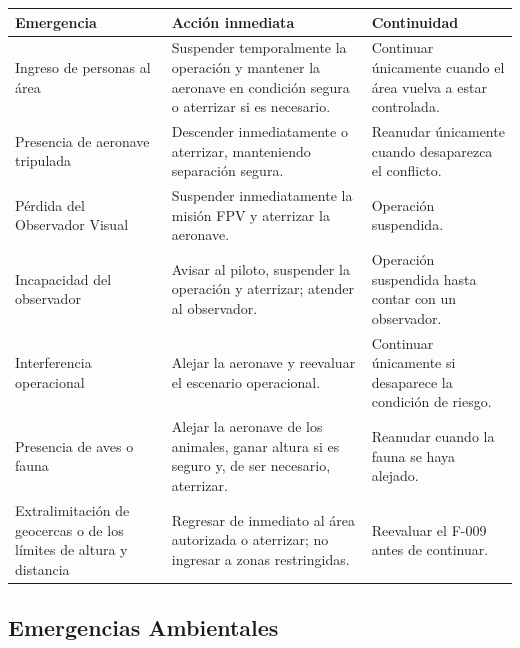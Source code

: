 \begin{longtable}{|p{4.5cm}|p{6cm}|p{3.5cm}|}
\hline

\textbf{Emergencia} &
\textbf{Acción inmediata} &
\textbf{Continuidad}

\\ \hline

Ingreso de personas al área &
Suspender temporalmente la operación y mantener la aeronave en condición segura o aterrizar si es necesario. &
Continuar únicamente cuando el área vuelva a estar controlada.

\\ \hline

Presencia de aeronave tripulada &
Descender inmediatamente o aterrizar, manteniendo separación segura. &
Reanudar únicamente cuando desaparezca el conflicto.

\\ \hline

Pérdida del Observador Visual &
Suspender inmediatamente la misión FPV y aterrizar la aeronave. &
Operación suspendida.

\\ \hline

Incapacidad del observador &
Avisar al piloto, suspender la operación y aterrizar; atender al observador. &
Operación suspendida hasta contar con un observador.

\\ \hline

Interferencia operacional &
Alejar la aeronave y reevaluar el escenario operacional. &
Continuar únicamente si desaparece la condición de riesgo.

\\ \hline

Presencia de aves o fauna &
Alejar la aeronave de los animales, ganar altura si es seguro y, de ser necesario, aterrizar. &
Reanudar cuando la fauna se haya alejado.

\\ \hline

Extralimitación de geocercas o de los límites de altura y distancia &
Regresar de inmediato al área autorizada o aterrizar; no ingresar a zonas restringidas. &
Reevaluar el F-009 antes de continuar.

\\ \hline

\end{longtable}

\subsection{Emergencias Ambientales}

